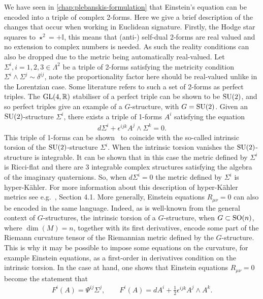 \documentclass[10pt]{report}
\theoremstyle{definition}
\newcommand{\R}[0]{\mathbb{R}}
\newcommand{\id}{\mathbb{I}}
\begin{document}
We have seen in \cref{chap:plebanskis-formulation} that Einstein's equation can be encoded into a triple of complex 2-forms. Here we give a brief description of the changes that occur when working in Euclidean signature. Firstly, the Hodge star squares to $\star^2 = +\id$, this means that (anti-) self-dual 2-forms are real valued and no extension to complex numbers is needed. As such the reality conditions can also be dropped due to the metric being automatically real-valued. Let $\Sigma^i, i=1,2,3 \in \Lambda^2$ be a triple of 2-forms satisfying the metricity condition $\Sigma^i \wedge \Sigma^j \sim \delta^{ij}$, note the proportionality factor here should be real-valued unlike in the Lorentzian case. Some literature refers to such a set of 2-forms as perfect triples. The ${\rm GL}(4,\R)$ stabiliser of a perfect triple can be shown to be ${\rm SU}(2)$, and so perfect triples give an example of a $G$-structure, with $G={\rm SU}(2)$. Given an ${\rm SU}(2)$-structure $\Sigma^i$, there exists a triple of 1-forms $A^i$ satisfying the equation
\begin{align}\label{pleb-1}
d\Sigma^i + \epsilon^{ijk} A^j\wedge \Sigma^k = 0.
\end{align}
This triple of 1-forms can be shown~\cite{Su2StructureBhoja2024} to coincide with the so-called intrinsic torsion of the ${\rm SU}(2)$-structure $\Sigma^i$. When the intrinsic torsion vanishes the ${\rm SU}(2)$-structure is integrable. It can be shown that in this case the metric defined by $\Sigma^i$ is Ricci-flat and there are 3 integrable complex structures satisfying the algebra of the imaginary quaternions. So, when $d\Sigma^i=0$ the metric defined by $\Sigma^i$ is hyper-K\"ahler. For more information about this description of hyper-K\"ahler metrics see e.g.~\cite{The_Kummer_Cons_Jiang_2025}, Section 4.1. More generally, Einstein equations $R_{\mu\nu}=0$ can also be encoded in the same language. Indeed, as is well-known from the general context of $G$-structures, the intrinsic torsion of a $G$-structure, when $G\subset{\rm SO}(n)$, where $\dim(M)=n$, together with its first derivatives, encode some part of the Riemann curvature tensor of the Riemannian metric defined by the $G$-structure. This is why it may be possible to impose some equations on the curvature, for example Einstein equations, as a first-order in derivatives condition on the intrinsic torsion. In the case at hand, one shows that Einstein equations $R_{\mu\nu} = 0$ become the statement that 
\begin{align}\label{pleb-2}
F^i(A) = \Psi^{ij} \Sigma^j, \qquad F^i(A) = dA^i + \frac{1}{2} \epsilon^{ijk} A^j\wedge A^k.
\end{align}
\end{document}
